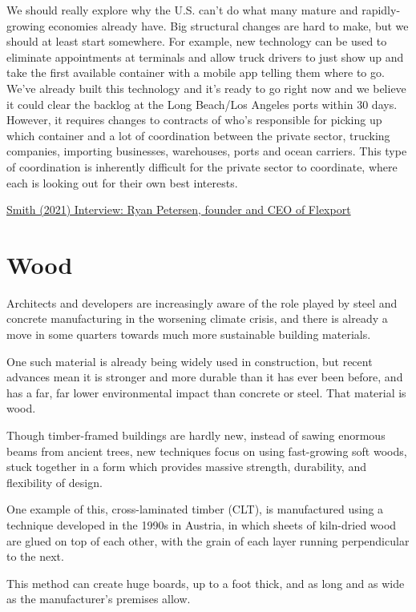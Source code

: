 \documentclass[
]{book}
\begin{document}
We should really explore why the U.S. can't do what many mature and rapidly-growing economies already have. Big structural changes are hard to make, but we should at least start somewhere. For example, new technology can be used to eliminate appointments at terminals and allow truck drivers to just show up and take the first available container with a mobile app telling them where to go. We've already built this technology and it's ready to go right now and we believe it could clear the backlog at the Long Beach/Los Angeles ports within 30 days. However, it requires changes to contracts of who's responsible for picking up which container and a lot of coordination between the private sector, trucking companies, importing businesses, warehouses, ports and ocean carriers. This type of coordination is inherently difficult for the private sector to coordinate, where each is looking out for their own best interests.

\href{https://noahpinion.substack.com/p/interview-ryan-petersen-ceo-of-flexport}{Smith (2021) Interview: Ryan Petersen, founder and CEO of Flexport}

\hypertarget{wood}{%
\chapter{Wood}\label{wood}}

Architects and developers are increasingly aware of the role played by steel and concrete manufacturing in the worsening climate crisis, and there is already a move in some quarters towards much more sustainable building materials.

One such material is already being widely used in construction, but recent advances mean it is stronger and more durable than it has ever been before, and has a far, far lower environmental impact than concrete or steel. That material is wood.

Though timber-framed buildings are hardly new, instead of sawing enormous beams from ancient trees, new techniques focus on using fast-growing soft woods, stuck together in a form which provides massive strength, durability, and flexibility of design.

One example of this, cross-laminated timber (CLT), is manufactured using a technique developed in the 1990s in Austria, in which sheets of kiln-dried wood are glued on top of each other, with the grain of each layer running perpendicular to the next.

This method can create huge boards, up to a foot thick, and as long and as wide as the manufacturer's premises allow.
\end{document}
